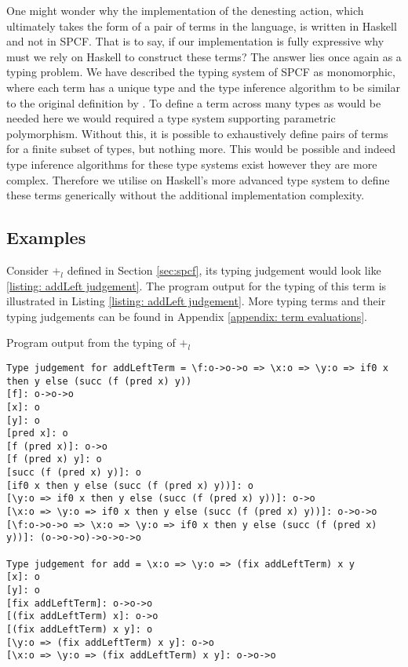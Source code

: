 \documentclass[12pt,a4paper]{report}
\theoremstyle{definition}
\theoremstyle{remark}
\begin{document}
One might wonder why the implementation of the denesting action, which ultimately takes the form of a pair of terms in the language, is written in Haskell and not in SPCF. That is to say, if our implementation is fully expressive why must we rely on Haskell to construct these terms? The answer lies once again as a typing problem. We have described the typing system of SPCF as monomorphic, where each term has a unique type and the type inference algorithm to be similar to the original definition by \cite{curry1958combinatory}. To define a term across many types as would be needed here we would required a type system supporting parametric polymorphism. Without this, it is possible to exhaustively define pairs of terms for a finite subset of types, but nothing more. This would be possible and indeed type inference algorithms for these type systems exist \cite[\emph{e.g.},][]{hindley_1969, milner_1978} however they are more complex. Therefore we utilise on Haskell's more advanced type system to define these terms generically without the additional implementation complexity. 

\subsection{Examples}
Consider $+_l$ defined in Section \ref{sec:spcf}, its typing judgement would look like \ref{listing: addLeft judgement}. The program output for the typing of this term is illustrated in Listing \ref{listing: addLeft judgement}. More typing terms and their typing judgements can be found in Appendix \ref{appendix: term evaluations}.
\begin{listing}
\caption{Program output from the typing of $+_l$}
\label{listing: addLeft judgement}
\begin{verbatim}
Type judgement for addLeftTerm = \f:o->o->o => \x:o => \y:o => if0 x then y else (succ (f (pred x) y))
[f]: o->o->o
[x]: o
[y]: o
[pred x]: o
[f (pred x)]: o->o
[f (pred x) y]: o
[succ (f (pred x) y)]: o
[if0 x then y else (succ (f (pred x) y))]: o
[\y:o => if0 x then y else (succ (f (pred x) y))]: o->o
[\x:o => \y:o => if0 x then y else (succ (f (pred x) y))]: o->o->o
[\f:o->o->o => \x:o => \y:o => if0 x then y else (succ (f (pred x) y))]: (o->o->o)->o->o->o

Type judgement for add = \x:o => \y:o => (fix addLeftTerm) x y
[x]: o
[y]: o
[fix addLeftTerm]: o->o->o
[(fix addLeftTerm) x]: o->o
[(fix addLeftTerm) x y]: o
[\y:o => (fix addLeftTerm) x y]: o->o
[\x:o => \y:o => (fix addLeftTerm) x y]: o->o->o
\end{verbatim}
\end{listing}
\end{document}
